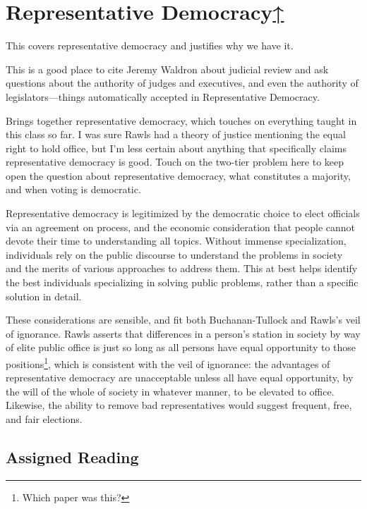 \label{cur:representative-democracy}
\section{Representative Democracy\hyperref[syllabus]{↑}}

This covers representative democracy and justifies why we have it.

This is a good place to cite Jeremy Waldron about judicial review and ask questions about the authority of judges and executives, and even the authority of legislators—things automatically accepted in Representative Democracy.

\begin{boxcomment}
    Brings together representative democracy, which touches on everything taught in this class so far.  I was sure Rawls had a theory of justice mentioning the equal right to hold office, but I'm less certain about anything that specifically claims representative democracy is good.  Touch on the two-tier problem here to keep open the question about representative democracy, what constitutes a majority, and when voting is democratic.
\end{boxcomment}

Representative democracy is legitimized by the democratic choice to elect officials via an agreement on process, and the economic consideration that people cannot devote their time to understanding all topics.  Without immense specialization, individuals rely on the public discourse to understand the problems in society and the merits of various approaches to address them.  This at best helps identify the best individuals specializing in solving public problems, rather than a specific solution in detail.

These considerations are sensible, and fit both Buchanan-Tullock and Rawls's veil of ignorance.  Rawls asserts that differences in a person's station in society by way of elite public office is just so long as all persons have equal opportunity to those positions\footnote{Which paper was this?}, which is consistent with the veil of ignorance:  the advantages of representative democracy are unacceptable unless all have equal opportunity, by the will of the whole of society in whatever manner, to be elevated to office.  Likewise, the ability to remove bad representatives would suggest frequent, free, and fair elections.

\subsection{Assigned Reading}

